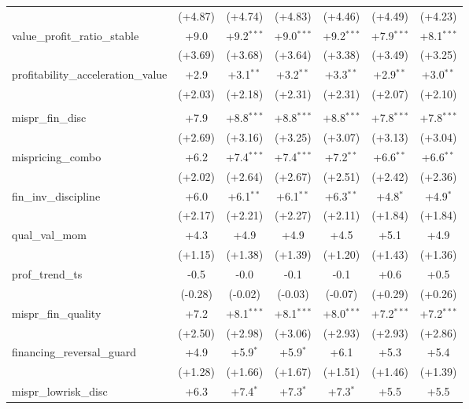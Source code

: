 \begin{table}[htbp]
\begin{threeparttable}
\begin{tabular}{lcccccc}
 & (+4.87) & (+4.74) & (+4.83) & (+4.46) & (+4.49) & (+4.23) \\
\addlinespace
value\_profit\_ratio\_stable & +9.0 & +9.2$^{***}$ & +9.0$^{***}$ & +9.2$^{***}$ & +7.9$^{***}$ & +8.1$^{***}$ \\
 & (+3.69) & (+3.68) & (+3.64) & (+3.38) & (+3.49) & (+3.25) \\
\addlinespace
profitability\_acceleration\_value & +2.9 & +3.1$^{**}$ & +3.2$^{**}$ & +3.3$^{**}$ & +2.9$^{**}$ & +3.0$^{**}$ \\
 & (+2.03) & (+2.18) & (+2.31) & (+2.31) & (+2.07) & (+2.10) \\
\addlinespace
\midrule
\multicolumn{7}{l}{\textit{Panel B: Out-of-sample (post-2000-12-31)}} \\
\addlinespace
mispr\_fin\_disc & +7.9 & +8.8$^{***}$ & +8.8$^{***}$ & +8.8$^{***}$ & +7.8$^{***}$ & +7.8$^{***}$ \\
 & (+2.69) & (+3.16) & (+3.25) & (+3.07) & (+3.13) & (+3.04) \\
\addlinespace
mispricing\_combo & +6.2 & +7.4$^{***}$ & +7.4$^{***}$ & +7.2$^{**}$ & +6.6$^{**}$ & +6.6$^{**}$ \\
 & (+2.02) & (+2.64) & (+2.67) & (+2.51) & (+2.42) & (+2.36) \\
\addlinespace
fin\_inv\_discipline & +6.0 & +6.1$^{**}$ & +6.1$^{**}$ & +6.3$^{**}$ & +4.8$^{*}$ & +4.9$^{*}$ \\
 & (+2.17) & (+2.21) & (+2.27) & (+2.11) & (+1.84) & (+1.84) \\
\addlinespace
qual\_val\_mom & +4.3 & +4.9 & +4.9 & +4.5 & +5.1 & +4.9 \\
 & (+1.15) & (+1.38) & (+1.39) & (+1.20) & (+1.43) & (+1.36) \\
\addlinespace
prof\_trend\_ts & -0.5 & -0.0 & -0.1 & -0.1 & +0.6 & +0.5 \\
 & (-0.28) & (-0.02) & (-0.03) & (-0.07) & (+0.29) & (+0.26) \\
\addlinespace
mispr\_fin\_quality & +7.2 & +8.1$^{***}$ & +8.1$^{***}$ & +8.0$^{***}$ & +7.2$^{***}$ & +7.2$^{***}$ \\
 & (+2.50) & (+2.98) & (+3.06) & (+2.93) & (+2.93) & (+2.86) \\
\addlinespace
financing\_reversal\_guard & +4.9 & +5.9$^{*}$ & +5.9$^{*}$ & +6.1 & +5.3 & +5.4 \\
 & (+1.28) & (+1.66) & (+1.67) & (+1.51) & (+1.46) & (+1.39) \\
\addlinespace
mispr\_lowrisk\_disc & +6.3 & +7.4$^{*}$ & +7.3$^{*}$ & +7.3$^{*}$ & +5.5 & +5.5 \\

\end{tabular}
\end{threeparttable}
\end{table}
